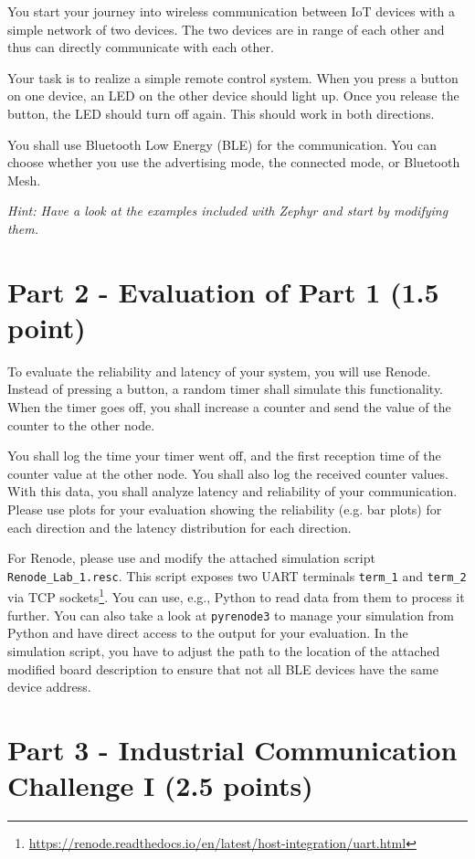 \documentclass[11pt]{article}
\begin{document}
You start your journey into wireless communication between IoT devices with a simple network of two devices. The two devices are in range of each other and thus can directly communicate with each other.

Your task is to realize a simple remote control system. When you press a button on one device, an LED on the other device should light up. Once you release the button, the LED should turn off again. This should work in both directions.

You shall use Bluetooth Low Energy (BLE) for the communication. You can choose whether you use the advertising mode, the connected mode, or Bluetooth Mesh.

\textit{Hint: Have a look at the examples included with Zephyr and start by modifying them.}

\section*{Part 2 - Evaluation of Part 1 (1.5 point)}

To evaluate the reliability and latency of your system, you will use Renode. Instead of pressing a button, a random timer shall simulate this functionality. When the timer goes off, you shall increase a counter and send the value of the counter to the other node.

You shall log the time your timer went off, and the first reception time of the counter value at the other node. You shall also log the received counter values. With this data, you shall analyze latency and reliability of your communication. Please use plots for your evaluation showing the reliability (e.g. bar plots) for each direction and the latency distribution for each direction.

For Renode, please use and modify the attached simulation script \texttt{Renode\_Lab\_1.resc}. This script exposes two UART terminals \texttt{term\_1} and \texttt{term\_2} via TCP sockets\footnote{\url{https://renode.readthedocs.io/en/latest/host-integration/uart.html}}. You  can use, e.g., Python to read data from them to process it further. You can also take a look at \texttt{pyrenode3} to manage your simulation from Python and have direct access to the output for your evaluation. In the simulation script, you have to adjust the path to the location of the attached modified board description to ensure that not all BLE devices have the same device address.

\section*{Part 3 - Industrial Communication Challenge I (2.5 points)}
\end{document}

